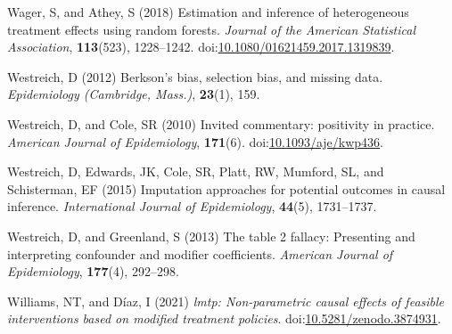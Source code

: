 \documentclass[
  singlecolumn]{article}
\newlength{\cslhangindent}
\newenvironment{CSLReferences}[2] %
 {\begin{list}{}{%
  \setlength{\itemindent}{0pt}
  \setlength{\leftmargin}{0pt}
  \setlength{\parsep}{0pt}
  \ifodd #1
   \setlength{\leftmargin}{\cslhangindent}
   \setlength{\itemindent}{-1\cslhangindent}
  \fi
  \setlength{\itemsep}{#2\baselineskip}}}
 {\end{list}}
\begin{document}
\begin{CSLReferences}{1}{0}
Wager, S, and Athey, S (2018) Estimation and inference of heterogeneous
treatment effects using random forests. \emph{Journal of the American
Statistical Association}, \textbf{113}(523), 1228--1242.
doi:\href{https://doi.org/10.1080/01621459.2017.1319839}{10.1080/01621459.2017.1319839}.

Westreich, D (2012) Berkson's bias, selection bias, and missing data.
\emph{Epidemiology (Cambridge, Mass.)}, \textbf{23}(1), 159.

Westreich, D, and Cole, SR (2010) Invited commentary: positivity in
practice. \emph{American Journal of Epidemiology}, \textbf{171}(6).
doi:\href{https://doi.org/10.1093/aje/kwp436}{10.1093/aje/kwp436}.

Westreich, D, Edwards, JK, Cole, SR, Platt, RW, Mumford, SL, and
Schisterman, EF (2015) Imputation approaches for potential outcomes in
causal inference. \emph{International Journal of Epidemiology},
\textbf{44}(5), 1731--1737.

Westreich, D, and Greenland, S (2013) The table 2 fallacy: Presenting
and interpreting confounder and modifier coefficients. \emph{American
Journal of Epidemiology}, \textbf{177}(4), 292--298.

Williams, NT, and Díaz, I (2021) \emph{{l}mtp: Non-parametric causal
effects of feasible interventions based on modified treatment policies}.
doi:\href{https://doi.org/10.5281/zenodo.3874931}{10.5281/zenodo.3874931}.

\end{CSLReferences}
\end{document}
